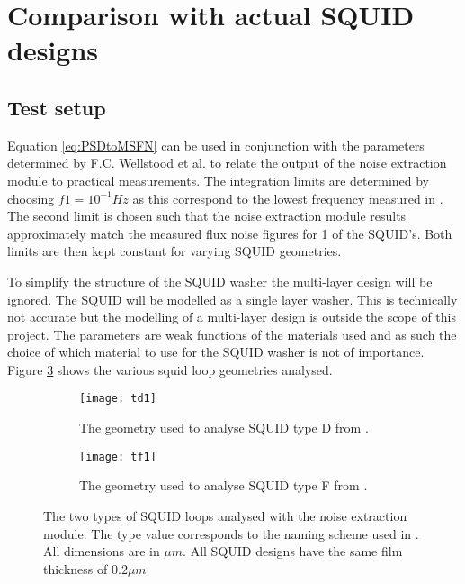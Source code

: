 \section{Comparison with actual SQUID designs}
\subsection{Test setup}
Equation \ref{eq:PSDtoMSFN} can be used in conjunction with the parameters determined by F.C. Wellstood et al. \cite{FluxNoiseCol} to relate the output of the noise extraction module to practical measurements. The integration limits are determined by choosing $f1 = 10^{-1} Hz$ as this correspond to the lowest frequency measured in \cite{FluxNoiseCol}. The second limit is chosen such that the noise extraction module results approximately match the measured flux noise figures for 1 of the SQUID's. Both limits are then kept constant for varying SQUID geometries. \par
To simplify the structure of the SQUID washer the multi-layer design will be ignored. The SQUID will be modelled as a single layer washer. This is technically not accurate but the modelling of a multi-layer design is outside the scope of this project. The parameters are weak functions of the materials used and as such the choice of which material to use for the SQUID washer is not of importance. Figure \ref{fig:realCOMP} shows the various squid loop geometries analysed. 

\begin{figure}[H]
    \centering
    \begin{subfigure}[b]{0.4\textwidth}
        \centering
        \texttt{[image: td1]}
        \caption{The geometry used to analyse SQUID type D from \cite{FluxNoiseCol}.}
        \label{fig:type1D}
    \end{subfigure}
    \hfill
    \begin{subfigure}[b]{0.4\textwidth}
        \centering
        \texttt{[image: tf1]}
        \caption{The geometry used to analyse SQUID type F from \cite{FluxNoiseCol}.}
        \label{fig:type1F}
    \end{subfigure}
    \caption{The two types of SQUID loops analysed with the noise extraction module. The type value corresponds to the naming scheme used in \cite{FluxNoiseCol}. All dimensions are in $\mu m$. All SQUID designs have the same film thickness of $0.2 \mu m$}
    \label{fig:realCOMP}
\end{figure}

